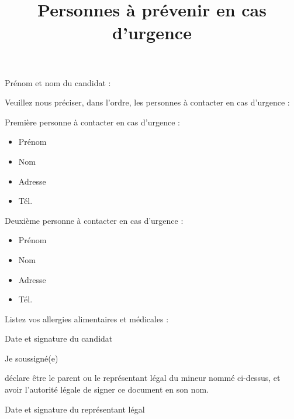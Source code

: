 \documentclass[a4paper,11pt]{prologin}
\title{Personnes à prévenir en cas d'urgence}
\begin{document}
Prénom et nom du candidat : \hrulefill

Veuillez nous préciser, dans l'ordre, les personnes à contacter en cas d'urgence :

Première personne à contacter en cas d'urgence :
\begin{itemize}
    \item Prénom \hrulefill
    \item Nom \hrulefill
    \item Adresse \hrulefill
    \item Tél. \hrulefill
\end{itemize}\vspace\baselineskip

Deuxième personne à contacter en cas d'urgence :
\begin{itemize}
    \item Prénom \hrulefill
    \item Nom \hrulefill
    \item Adresse \hrulefill
    \item Tél. \hrulefill
\end{itemize}\vspace\baselineskip

Listez vos allergies alimentaires et médicales :

\hrulefill

\hrulefill

\begin{signatureframe}{Date et signature du candidat}\end{signatureframe}

\begin{legalrepframe}
Je soussigné(e) \hrulefill

déclare être le parent ou le représentant légal du mineur nommé
ci-dessus, et avoir l'autorité légale de signer ce document en son nom.

\begin{signatureframe}{Date et signature du représentant légal}\end{signatureframe}
\end{legalrepframe}
\end{document}

